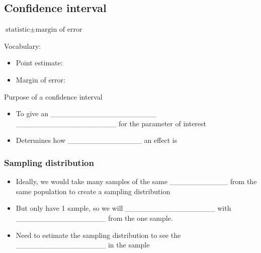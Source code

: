 \documentclass[
]{report}
\providecommand{\tightlist}{%
  \setlength{\itemsep}{0pt}\setlength{\parskip}{0pt}}
\newcommand{\rgi}{\hspace{24pt}}  %
\begin{document}
\hypertarget{confidence-interval}{%
\subsection*{Confidence interval}\label{confidence-interval}}

\rgi \(\text{statistic} \pm \text{margin of error}\)

Vocabulary:

\begin{itemize}
\tightlist
\item
  Point estimate:
\end{itemize}

\vspace{0.3in}

\begin{itemize}
\tightlist
\item
  Margin of error:
\end{itemize}

\vspace{0.3in}


Purpose of a confidence interval

\begin{itemize}
\item
  To give an \_\_\_\_\_\_\_\_\_\_\_\_\_\_\_\_\_\_\_\_ \_\_\_\_\_\_\_\_\_\_\_\_\_\_\_\_\_\_\_ for the parameter of interest
\item
  Determines how \_\_\_\_\_\_\_\_\_\_\_\_\_\_ an effect is
\end{itemize}


\hypertarget{sampling-distribution}{%
\subsubsection*{Sampling distribution}\label{sampling-distribution}}


\begin{itemize}
\item
  Ideally, we would take many samples of the same \_\_\_\_\_\_\_\_\_\_\_ from the same population to create a sampling distribution
\item
  But only have 1 sample, so we will \_\_\_\_\_\_\_\_\_\_\_\_\_\_\_\_\_ with \_\_\_\_\_\_\_\_\_\_\_\_\_\_\_\_\_ from the one sample.
\item
  Need to estimate the sampling distribution to see the \_\_\_\_\_\_\_\_\_\_\_\_\_\_\_\_\_ in the sample
\end{itemize}
\end{document}

